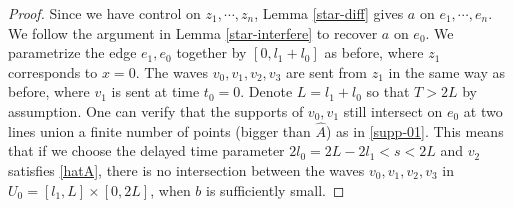 \documentclass[11pt]{amsart}
\theoremstyle{definition}
\theoremstyle{plain}
\numberwithin{equation}{section}
\begin{document}
\begin{proof}
Since we have control on $z_1,\cdots,z_{n}$, Lemma \ref{star-diff} gives $a$ on $e_1,\cdots,e_{n}$.
We follow the argument in Lemma \ref{star-interfere} to recover $a$ on $e_0$.
We parametrize the edge $e_1,e_0$ together by $[0,l_1+l_0]$ as before, where $z_1$ corresponds to $x=0$.
The waves $v_0,v_1,v_2,v_3$ are sent from $z_1$ in the same way as before, where $v_1$ is sent at time $t_0=0$. 
Denote $L=l_1+l_0$ so that $T>2L$ by assumption.
One can verify that the supports of $v_0,v_1$ still intersect on $e_0$ at two lines union a finite number of points (bigger than $\hat{A}$) as in \eqref{supp-01}.
This means that if we choose the delayed time parameter $2l_0=2L-2l_1<s<2L$ and $v_2$ satisfies \eqref{hatA}, there is no intersection between the waves $v_0,v_1,v_2,v_3$ in $U_0=[l_1,L]\times [0,2L]$, when $b$ is sufficiently small.


\end{proof}
\end{document}
